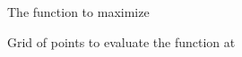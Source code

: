 \documentclass[
    xcolor={svgnames,dvipsnames},
    hyperref={colorlinks, citecolor=DeepPink4, linkcolor=DarkRed, urlcolor=DarkBlue}
    ]{beamer}  %
\newcommand{\1}{\mathbbm 1}
\begin{document}
\begin{frame}
    
    \begin{figure}
       \begin{center}
           \caption{The function to maximize}
       \end{center}
    \end{figure}

\end{frame}



\begin{frame}
    
    \begin{figure}
       \begin{center}
           \caption{Grid of points to evaluate the function at}
       \end{center}
    \end{figure}

\end{frame}
\end{document}
